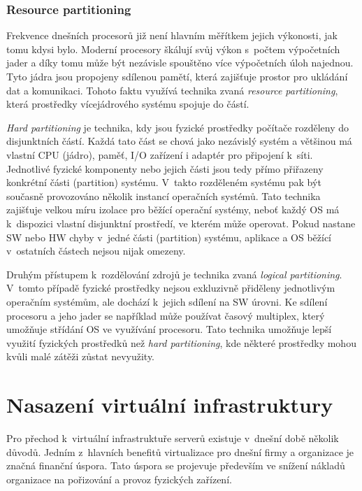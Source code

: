 \subsubsection{Resource partitioning}
\label{chapter:virtualization:clasification:system_vm:partitioning}
Frekvence dnešních procesorů již není hlavním měřítkem jejich výkonosti, jak tomu kdysi bylo. Moderní procesory škálují svůj
výkon s~počtem výpočetních jader a díky tomu může být nezávisle spouštěno více výpočetních úloh najednou. Tyto jádra jsou 
propojeny sdílenou pamětí, která zajišťuje prostor pro ukládání dat a komunikaci. Tohoto faktu využívá technika zvaná 
\textit{resource partitioning}, která prostředky vícejádrového systému spojuje do částí.

\textit{Hard partitioning} je technika, kdy jsou fyzické prostředky počítače rozděleny do disjunktních částí. Každá tato část
se chová jako nezávislý systém a většinou má vlastní CPU (jádro), paměť, I/O zařízení i adaptér pro připojení k~síti. Jednotlivé
fyzické komponenty nebo jejich části jsou tedy přímo přiřazeny konkrétní části (partition) systému. V~takto rozděleném systému
pak být současně provozováno několik instancí operačních systémů. Tato technika zajišťuje velkou míru izolace pro běžící operační
systémy, neboť každý OS má k~dispozici vlastní disjunktní prostředí, ve kterém může operovat. Pokud nastane SW nebo HW chyby
v~jedné části (partition) systému, aplikace a OS běžící v~ostatních částech nejsou nijak omezeny.

Druhým přístupem k~rozdělování zdrojů je technika zvaná \textit{logical partitioning}. V~tomto případě fyzické prostředky nejsou
exkluzivně přiděleny jednotlivým operačním systémům, ale dochází k~jejich sdílení na SW úrovni. Ke sdílení procesoru a jeho jader
se například může používat časový multiplex, který umožňuje střídání OS ve využívání procesoru. Tato technika umožňuje lepší
využití fyzických prostředků než \textit{hard partitioning}, kde některé prostředky mohou kvůli malé zátěži zůstat nevyužity.
\section{Nasazení virtuální infrastruktury}
\label{chapter:virtualization:deployment}
Pro přechod k~virtuální infrastruktuře serverů existuje v~dnešní době několik důvodů. Jedním z~hlavních benefitů virtualizace
pro dnešní firmy a organizace je značná finanční úspora. Tato úspora se projevuje především ve snížení nákladů organizace na
pořizování a provoz fyzických zařízení. 

